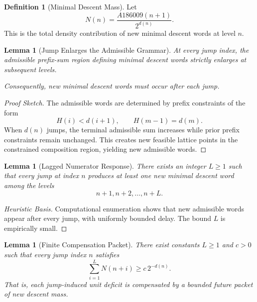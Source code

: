 \documentclass[12pt, oneside]{article}
\numberwithin{equation}{section}
\theoremstyle{definition}
\newtheorem{definition}{Definition}[section]
\theoremstyle{plain}
\newtheorem{lemma}[theorem]{Lemma}
\theoremstyle{remark}
\begin{document}
\begin{definition}[Minimal Descent Mass]
Let
\[
N(n)=\frac{A186009(n+1)}{2^{d(n)}}.
\]
This is the total density contribution of new minimal descent words at
level $n$.
\end{definition}


\begin{lemma}[Jump Enlarges the Admissible Grammar]
\label{lem:jump-grammar}
At every jump index, the admissible prefix-sum region defining minimal
descent words strictly enlarges at subsequent levels.

Consequently, new minimal descent words must occur after each jump.
\end{lemma}

\begin{proof}[Proof Sketch]
The admissible words are determined by prefix constraints of the form
\[
H(i)<d(i+1), \qquad H(m-1)=d(m).
\]
When $d(n)$ jumps, the terminal admissible sum increases while prior
prefix constraints remain unchanged. This creates new feasible lattice
points in the constrained composition region, yielding new admissible
words.
\end{proof}


\begin{lemma}[Lagged Numerator Response]
\label{lem:lagged-response}
There exists an integer $L\ge1$ such that every jump at index $n$
produces at least one new minimal descent word among the levels
\[
n+1,n+2,\dots,n+L.
\]
\end{lemma}

\begin{proof}[Heuristic Basis]
Computational enumeration shows that new admissible words appear after
every jump, with uniformly bounded delay. The bound $L$ is empirically
small.
\end{proof}


\begin{lemma}[Finite Compensation Packet]
\label{lem:packet}
There exist constants $L\ge1$ and $c>0$ such that every jump index $n$
satisfies
\[
\sum_{i=1}^{L} N(n+i)\ge c\,2^{-d(n)}.
\]
That is, each jump-induced unit deficit is compensated by a bounded
future packet of new descent mass.
\end{lemma}
\end{document}
